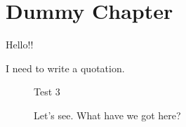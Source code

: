 \chapter{Dummy Chapter}

Hello!!

I need to write a quotation.

\begin{quotation}
\lipsum[1-2]
\end{quotation}

\begin{figure}[hbt!]
\centering Test 3
\caption{Let's see. What have we got here?}
\end{figure}
